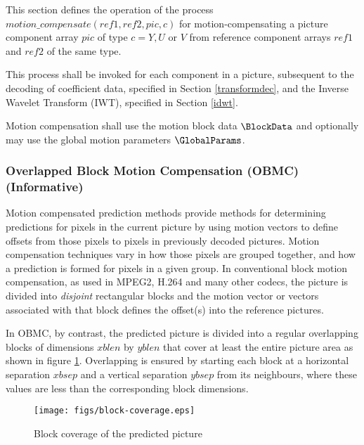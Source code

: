 \label{motioncompensate}

This section defines the operation of the process
$motion\_compensate(ref1, ref2,  pic, c)$ for motion-compensating a
picture component array  $pic$ of type $c=Y, U$ or $V$ from reference 
component arrays $ref1$ and $ref2$ of the same type.

This process shall be invoked for each component in a picture, subsequent to the 
decoding of coefficient data, specified in Section \ref{transformdec}, and the Inverse Wavelet Transform (IWT), specified in Section \ref{idwt}. 

Motion compensation shall use the motion block data $\BlockData$ and optionally may use the
global motion parameters $\GlobalParams$.

\begin{informative*}
\subsubsection{Overlapped Block Motion Compensation (OBMC) (Informative)}

Motion compensated prediction methods provide methods for determining 
predictions for pixels in the current picture by using motion vectors to 
define offsets from those pixels to pixels in previously decoded
pictures. Motion compensation techniques vary in how those pixels are grouped
together, and how a prediction is formed for pixels in a given group. In 
conventional  block motion compensation, as used in MPEG2, H.264 and many other
codecs, the picture is divided into {\em disjoint} rectangular blocks and the
motion vector or vectors associated with that block defines the offset(s) into
the reference pictures.

In OBMC, by contrast, the predicted picture is divided into a regular overlapping 
blocks of dimensions $xblen$ by $yblen$ that cover at least the entire picture 
area as shown in figure \ref{fig:blockcoverage}.  Overlapping is ensured by starting
each block at a horizontal separation $xbsep$ and a vertical separation $ybsep$ 
from its neighbours, where these values are less than the corresponding block dimensions.
\end{informative*}

\begin{figure}[!ht]
\centering
\texttt{[image: figs/block-coverage.eps]}
\caption{Block coverage of the predicted picture}
\label{fig:blockcoverage}
\end{figure}

